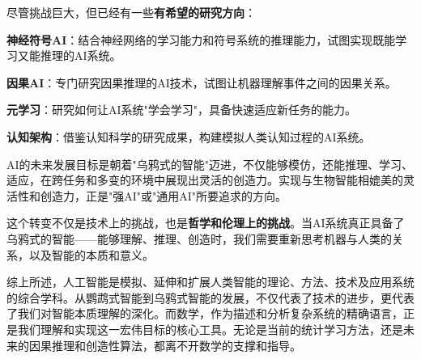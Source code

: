 尽管挑战巨大，但已经有一些{\bf 有希望的研究方向}：

{\bf 神经符号AI}：结合神经网络的学习能力和符号系统的推理能力，试图实现既能学习又能推理的AI系统。

{\bf 因果AI}：专门研究因果推理的AI技术，试图让机器理解事件之间的因果关系。

{\bf 元学习}：研究如何让AI系统"学会学习"，具备快速适应新任务的能力。

{\bf 认知架构}：借鉴认知科学的研究成果，构建模拟人类认知过程的AI系统。

AI的未来发展目标是朝着"乌鸦式的智能"迈进，不仅能够模仿，还能推理、学习、适应，在跨任务和多变的环境中展现出灵活的创造力。实现与生物智能相媲美的灵活性和创造力，正是"强AI"或"通用AI"所要追求的方向。

这个转变不仅是技术上的挑战，也是{\bf 哲学和伦理上的挑战}。当AI系统真正具备了乌鸦式的智能——能够理解、推理、创造时，我们需要重新思考机器与人类的关系，以及智能的本质和意义。

综上所述，人工智能是模拟、延伸和扩展人类智能的理论、方法、技术及应用系统的综合学科。从鹦鹉式智能到乌鸦式智能的发展，不仅代表了技术的进步，更代表了我们对智能本质理解的深化。而数学，作为描述和分析复杂系统的精确语言，正是我们理解和实现这一宏伟目标的核心工具。无论是当前的统计学习方法，还是未来的因果推理和创造性算法，都离不开数学的支撑和指导。

\nocite{*}

\newpage
